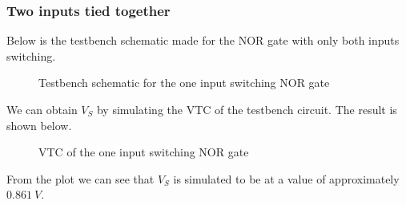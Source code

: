 \documentclass[12pt]{article}
\begin{document}
\subsubsection{Two inputs tied together}
Below is the testbench schematic made for the NOR gate with only both inputs switching.
\begin{figure} [H]
    \centering
    \caption{Testbench schematic for the one input switching NOR gate}
\end{figure}
We can obtain $V_S$ by simulating the VTC of the testbench circuit. The result is shown below.
\begin{figure} [H]
    \centering
    \caption{VTC of the one input switching NOR gate}
\end{figure}
From the plot we can see that $V_S$ is simulated to be at a value of approximately $\SI{0.861}{V}$.
\end{document}
